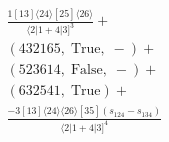 \documentclass[varwidth, border=5pt]{standalone}
\begin{document}
\begin{my}
$\begin{gathered}
\scriptscriptstyle\frac{1[13]⟨24⟩[25]⟨26⟩}{⟨2|1+4|3]^3}+\\
\scriptscriptstyle(432165,\;\text{True},\;-)+\\
\scriptscriptstyle(523614,\;\text{False},\;-)+\\
\scriptscriptstyle(632541,\;\text{True})+\\
\scriptscriptstyle\frac{-3[13]⟨24⟩⟨26⟩[35](s_{124}-s_{134})}{⟨2|1+4|3]^4}\phantom{+}
\end{gathered}$
\end{my}
\end{document}
